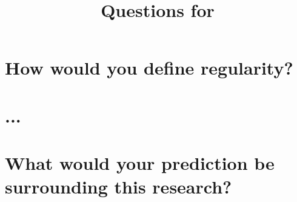 \documentclass{article}
\title{Questions for }
\begin{document}
\maketitle \vfill \tableofcontents \newpage

\section{How would you define regularity?}

\section{...}

\section{What would your prediction be surrounding this research?}
\end{document}
